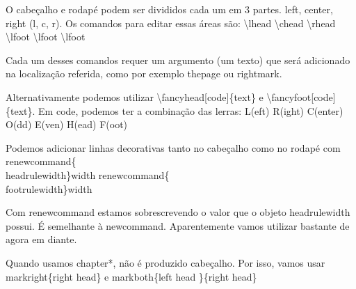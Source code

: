 \documentclass[a4paper, 12pts]{book}
\begin{document}
O cabeçalho e rodapé podem ser divididos cada um em 3 partes.
left, center, right (l, c, r).
Os comandos para editar essas áreas são:
\textbackslash lhead \textbackslash chead \textbackslash rhead 
\textbackslash lfoot \textbackslash lfoot \textbackslash lfoot 

Cada um desses comandos requer um argumento (um texto) que será adicionado
na localização referida, como por exemplo thepage ou rightmark.

Alternativamente podemos utilizar \textbackslash fancyhead[code]\{text\} e
\textbackslash fancyfoot[code]\{text\}.
Em code, podemos ter a combinação das lerras:
L(eft) R(ight) C(enter) O(dd) E(ven) H(ead) F(oot)

Podemos adicionar linhas decorativas tanto no cabeçalho como no rodapé com
\textback renewcommand\{\\headrulewidth\}{width}
\textback renewcommand\{\\footrulewidth\}{width}

Com renewcommand estamos sobrescrevendo o valor que o objeto headrulewidth possui.
É semelhante à newcommand.
Aparentemente vamos utilizar bastante de agora em diante.

Quando usamos chapter*, não é produzido cabeçalho.
Por isso, vamos usar markright\{right head\} e markboth\{left head \}\{right head\}
\end{document}
